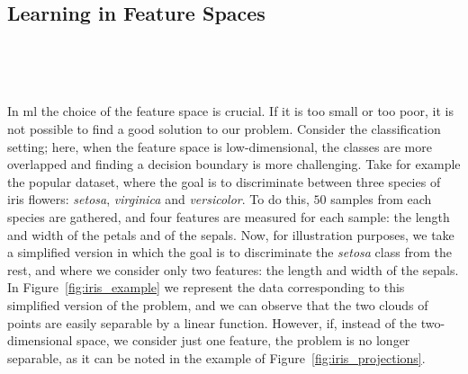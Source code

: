 \subsection{Learning in Feature Spaces} %

\begin{figure}[t!]
    \centering
    \quad%
    \\
    \caption{}
    \label{fig:iris}
\end{figure}

\begin{figure}[t!]
    \centering
    \quad%
    \quad
    \\
    \caption{}
    \label{fig:cubicreg}
\end{figure}

In \acrshort{ml} the choice of the feature space is crucial. If it is too small or too poor, it is not possible to find a good solution to our problem.
Consider the classification setting; here, when the feature space is low-dimensional, the classes are more overlapped and finding a decision boundary is more challenging. 
%
Take for example the popular  dataset, where the goal is to discriminate between three species of iris flowers: \emph{setosa}, \emph{virginica} and \emph{versicolor}. To do this, $50$ samples from each species are gathered, and four features are measured for each sample: the length and width of the petals and of the sepals.
%
Now, for illustration purposes, we take a simplified version in which the goal is to discriminate the \emph{setosa} class from the rest, and where we consider only two features: the length and width of the sepals. In Figure~\ref{fig:iris_example} we represent the data corresponding to this simplified version of the  problem, and we can observe that the two clouds of points are easily separable by a linear function. However, if, instead of the two-dimensional space, we consider just one feature, the problem is no longer separable, as it can be noted in the example of Figure~\ref{fig:iris_projections}.
%


